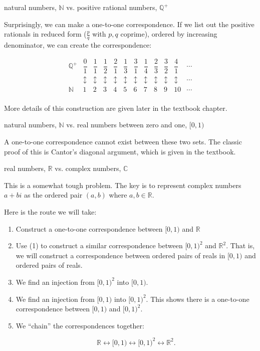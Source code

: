 \documentclass[../gatm_answers.tex]{subfiles}
\begin{document}
\begin{inner_problem}
\item natural numbers, $\mathbb{N}$ vs. positive rational numbers, $\mathbb{Q}^+$
\end{inner_problem}

Surprisingly, we can make a one-to-one correspondence. If we list out the positive rationals in reduced form ($\frac{p}{q}$ with $p,q$ coprime), ordered by increasing denominator, we can create the correspondence:

$$\renewcommand{\arraystretch}{1.6}\begin{array}{cccccccccccc}
\mathbb{Q}^+ & \dfrac{0}{1} & \dfrac{1}{1} & \dfrac{1}{2} & \dfrac{2}{1} & \dfrac{1}{3} & \dfrac{3}{1} & \dfrac{1}{4} & \dfrac{2}{3} & \dfrac{3}{2} & \dfrac{4}{1} & \cdots \\
& \updownarrow & \updownarrow & \updownarrow & \updownarrow & \updownarrow & \updownarrow & \updownarrow & \updownarrow & \updownarrow & \updownarrow & \cdots \\
\mathbb{N} & 1 & 2 & 3 & 4 & 5 & 6 & 7 & 8 & 9 & 10 & \cdots \\
\end{array}$$

More details of this construction are given later in the textbook chapter.

\begin{inner_problem}
\item natural numbers, $\mathbb{N}$ vs. real numbers between zero and one, $[0,1)$
\end{inner_problem}

A one-to-one correspondence cannot exist between these two sets. The classic proof of this is Cantor's diagonal argument, which is given in the textbook. 

\begin{inner_problem}
\item real numbers, $\mathbb{R}$ vs. complex numbers, $\mathbb{C}$
\end{inner_problem}

This is a somewhat tough problem. The key is to represent complex numbers $a+bi$ as the ordered pair $(a,b)$ where $a,b\in \mathbb{R}$.

Here is the route we will take:

\begin{enumerate}
\item Construct a one-to-one correspondence between $[0,1)$ and $\mathbb{R}$
\item Use (1) to construct a similar correspondence between $[0,1)^2$ and $\mathbb{R}^2$. That is, we will construct a correspondence between ordered pairs of reals in $[0,1)$ and ordered pairs of reals.
\item We find an injection from $[0,1)^2$ into $[0,1)$.
\item We find an injection from $[0,1)$ into $[0,1)^2$. This shows there is a one-to-one correspondence between $[0,1)$ and $[0,1)^2$.
\item We ``chain'' the correspondences together:

$$\mathbb{R} \leftrightarrow [0,1) \leftrightarrow [0,1)^2 \leftrightarrow \mathbb{R}^2.$$
\end{enumerate}
\end{document}
